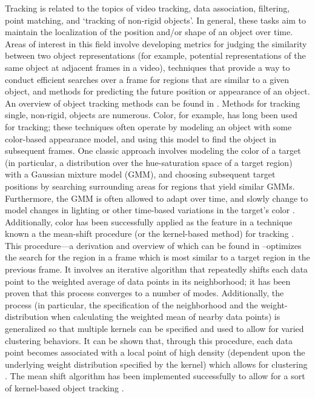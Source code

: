 \documentclass[twocolumn, final]{svjour3}
\begin{document}
Tracking is related to the topics of video tracking, data association, filtering, point matching, and `tracking of non-rigid objects'. In general, these tasks aim to maintain the localization of the position and/or shape of an object over time. Areas of interest in this field involve developing metrics for judging the similarity between two object representations (for example, potential representations of the same object at adjacent frames in a video), techniques that provide a way to conduct efficient searches over a frame for regions that are similar to a given object, and methods for predicting the future position or appearance of an object. An overview of object tracking methods can be found in \cite{yilmaz2006object}. Methods for tracking single, non-rigid, objects are numerous. Color, for example, has long been used for tracking; these techniques often operate by modeling an object with some color-based appearance model, and using this model to find the object in subsequent frames. One classic approach involves modeling the color of a target (in particular, a distribution over the hue-saturation space of a target region) with a Gaussian mixture model (GMM), and choosing subsequent target positions by searching surrounding areas for regions that yield similar GMMs. Furthermore, the GMM is often allowed to adapt over time, and slowly change to model changes in lighting or other time-based variations in the target's color \citep{raja_1998, mckenna_1999, jepson_2003}. Additionally, color has been successfully applied as the feature in a technique known a the mean-shift procedure (or the kernel-based method) for tracking \citep{comaniciu_2003, perez_2002, nummiaro_2003, lee_2011}. This procedure---a derivation and overview of which can be found in \citep{fukunaga_1975, cheng_1995}--optimizes the search for the region in a frame which is most similar to a target region in the previous frame. It involves an iterative algorithm that repeatedly shifts each data point to the weighted average of data points in its neighborhood; it has been proven that this process converges to a number of modes. Additionally, the process (in particular, the specification of the neighborhood and the weight-distribution when calculating the weighted mean of nearby data points) is generalized so that multiple kernels can be specified and used to allow for varied clustering behaviors. It can be shown that, through this procedure, each data point becomes associated with a local point of high density (dependent upon the underlying weight distribution specified by the kernel) which allows for clustering \citep{cheng_1995}. The mean shift algorithm has been implemented successfully to allow for a sort of kernel-based object tracking \citep{comaniciu_2003, comaniciu_1999, comaniciu_2000}.
\end{document}
